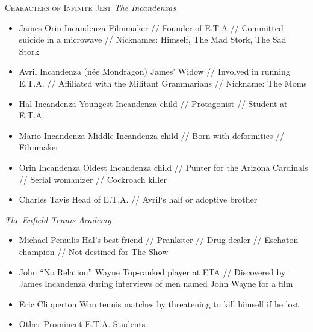\documentclass{article}
\begin{document}
\centering
\newpage
\begin{tcolorbox}[height=26cm]
\centering
\huge\textsc{Characters of Infinite Jest}
\small
\vspace{0.3cm}
\decorule
\vspace{0.3cm}
\large\emph{The Incandenzas}
\small
\begin{itemize}
\item James Orin Incandenza\newline
\scriptsize{Filmmaker // Founder of E.T.A // Committed suicide in a microwave // Nicknames: Himself, The Mad Stork, The Sad Stork}
\item \small{Avril Incandenza (n\'{e}e Mondragon)}\newline
\scriptsize{James' Widow // Involved in running E.T.A. // Affiliated with the Militant Grammarians // Nickname: The Moms}
\item \small{Hal Incandenza}\newline
\scriptsize{Youngest Incandenza child // Protagonist // Student at E.T.A.}
\item  \small{Mario Incandenza}\newline
\scriptsize{Middle Incandenza child // Born with deformities // Filmmaker}
\item  \small{Orin Incandenza}\newline
\scriptsize {Oldest Incandenza child // Punter for the Arizona Cardinals // Serial womanizer // Cockroach killer}
\item  \small{Charles Tavis}\newline
\scriptsize{Head of E.T.A. // Avril`s half or adoptive brother
}
\end{itemize}
\vspace{0.1cm}
\large\emph{The Enfield Tennis Academy}
\small
\begin{itemize}
\item  \small{Michael Pemulis}\newline
\scriptsize{Hal's best friend // Prankster // Drug dealer //  Eschaton champion // Not destined for The Show}
\item  \small{John ``No Relation'' Wayne}\newline
\scriptsize{Top-ranked player at ETA // Discovered by James Incandenza during interviews of men named John Wayne for a film}
\item  \small{Eric Clipperton}\newline
\scriptsize{Won tennis matches by threatening to kill himself if he lost}
\item  \small{Other Prominent E.T.A. Students}\newline

\end{itemize}
\end{tcolorbox}
\end{document}
